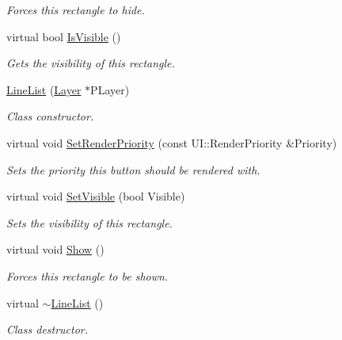 \begin{DoxyCompactItemize}
\begin{DoxyCompactList}\small\item\em Forces this rectangle to hide. \item\end{DoxyCompactList}\item 
virtual bool \hyperlink{classphys_1_1UI_1_1LineList_af8c50f2e60b5a087cc9f3a280e10bd72}{IsVisible} ()
\begin{DoxyCompactList}\small\item\em Gets the visibility of this rectangle. \item\end{DoxyCompactList}\item 
\hyperlink{classphys_1_1UI_1_1LineList_a4eb08071252e1bddf1237d6a4018a86c}{LineList} (\hyperlink{classphys_1_1UI_1_1Layer}{Layer} $\ast$PLayer)
\begin{DoxyCompactList}\small\item\em Class constructor. \item\end{DoxyCompactList}\item 
virtual void \hyperlink{classphys_1_1UI_1_1LineList_aaa62a555258c3572f3d994de38028f01}{SetRenderPriority} (const UI::RenderPriority \&Priority)
\begin{DoxyCompactList}\small\item\em Sets the priority this button should be rendered with. \item\end{DoxyCompactList}\item 
virtual void \hyperlink{classphys_1_1UI_1_1LineList_acecf11c133825233afd73d55ba9e4c1d}{SetVisible} (bool Visible)
\begin{DoxyCompactList}\small\item\em Sets the visibility of this rectangle. \item\end{DoxyCompactList}\item 
\hypertarget{classphys_1_1UI_1_1LineList_ae725a770a9b938d01f1a161be050fcc5}{
virtual void \hyperlink{classphys_1_1UI_1_1LineList_ae725a770a9b938d01f1a161be050fcc5}{Show} ()}
\label{classphys_1_1UI_1_1LineList_ae725a770a9b938d01f1a161be050fcc5}

\begin{DoxyCompactList}\small\item\em Forces this rectangle to be shown. \item\end{DoxyCompactList}\item 
\hypertarget{classphys_1_1UI_1_1LineList_ae962ca10492137ed85f7b66a79d4887e}{
virtual \hyperlink{classphys_1_1UI_1_1LineList_ae962ca10492137ed85f7b66a79d4887e}{$\sim$LineList} ()}
\label{classphys_1_1UI_1_1LineList_ae962ca10492137ed85f7b66a79d4887e}

\begin{DoxyCompactList}\small\item\em Class destructor. \item\end{DoxyCompactList}\end{DoxyCompactItemize}
